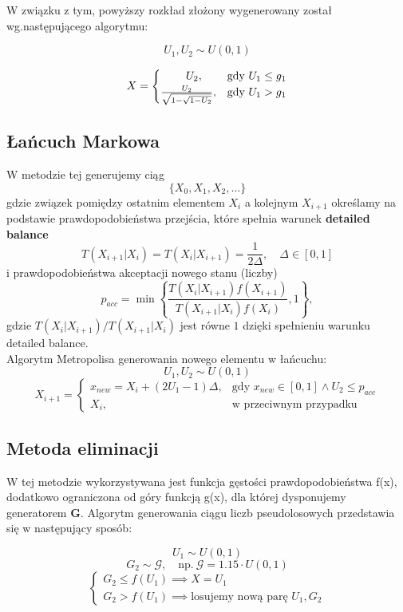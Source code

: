 \documentclass[a4paper,12pt,twoside]{article}
\begin{document}
\newpage
W związku z tym, powyższy rozkład złożony wygenerowany został wg.następującego algorytmu:

\[
U_1, U_2 \sim U(0, 1)
\]

\[
X = 
\begin{cases}

\hspace{8mm} U_2, & \text{gdy } U_1 \leq g_1 \\ 
\frac{U_2}{\sqrt{1 - \sqrt{1 - U_2}}}, & \text{gdy } U_1 > g_1 
\end{cases}

\]

\subsection{Łańcuch Markowa}

W metodzie tej generujemy ciąg  
\[
\{X_0, X_1, X_2, \ldots\}
\]
gdzie związek pomiędzy ostatnim elementem \( X_i \) a kolejnym \( X_{i+1} \) określamy na podstawie prawdopodobieństwa przejścia, które spełnia warunek \textbf{detailed balance}  
\[
T(X_{i+1}|X_i) = T(X_i|X_{i+1}) = \frac{1}{2\Delta}, \quad \Delta \in [0, 1]
\]
i prawdopodobieństwa akceptacji nowego stanu (liczby)  
\[
p_{acc} = \min \left\{ \frac{T(X_i|X_{i+1}) f(X_{i+1})}{T(X_{i+1}|X_i) f(X_i)}, 1 \right\},
\]
gdzie $T(X_i|X_{i+1})/T(X_{i+1}|X_i)$ jest równe $1$ dzięki spełnieniu warunku detailed balance. \\

Algorytm Metropolisa generowania nowego elementu w łańcuchu:
\[
U_1, U_2 \sim U(0, 1)
\]
\[
X_{i+1} = 
\begin{cases} 
x_{new} = X_i + (2U_1 - 1)\Delta, & \text{gdy } x_{new} \in [0, 1] \land U_2 \leq p_{acc} \\ 
X_i, & \text{w przeciwnym przypadku}
\end{cases}
\]


\subsection{Metoda eliminacji}

W tej metodzie wykorzystywana jest funkcja gęstości prawdopodobieństwa f(x), dodatkowo ograniczona od góry funkcją g(x), dla której dysponujemy generatorem \textbf{G}. Algorytm generowania ciągu liczb pseudolosowych przedstawia się w następujący sposób:

\[
U_1 \sim U(0, 1)
\]
\[
G_2 \sim \mathcal{G}, \quad \text{np.} \ \mathcal{G} = 1.15 \cdot U(0, 1)
\]
\[
\begin{cases} 
G_2 \leq f(U_1) \implies X = U_1 \\ 
G_2 > f(U_1) \implies \text{losujemy nową parę } U_1, G_2 
\end{cases}
\]
\end{document}
